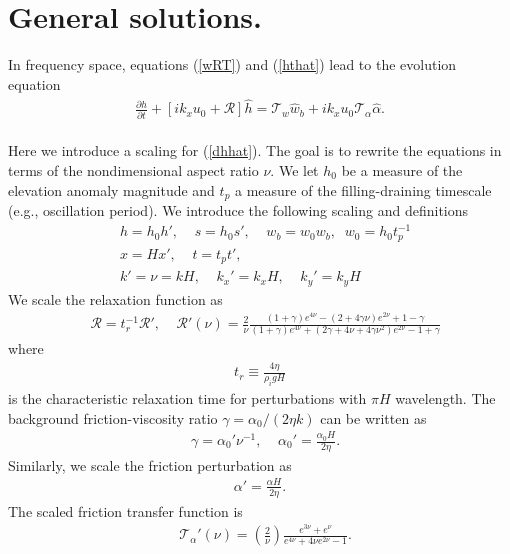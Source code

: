 \documentclass[paper=a4, fontsize=11pt]{article}
\begin{document}
\section*{General solutions.}
In frequency space,
equations (\ref{wRT}) and (\ref{hthat}) lead to the evolution equation
\begin{align}
\frac{\partial \widehat{h}}{\partial t}+ \left[ik_xu_0  + \mathcal{R}\right]\widehat{h} = \mathcal{T}_w\widehat{w}_b+ik_xu_0\mathcal{T}_{\alpha} \widehat{\alpha}. \label{dhhat}
\end{align}
\\
Here we introduce a scaling for (\ref{dhhat}).
The goal is to rewrite the equations in terms of the nondimensional
aspect ratio $\nu$.
We let $h_0$ be a measure of the elevation anomaly magnitude and
$t_p$ a measure of the filling-draining timescale (e.g., oscillation period).
We introduce the following scaling and definitions
\begin{align}
& h = h_0 h', \;\;\;\; s = h_0 s',\;\;\;\; w_b = w_0 w_{b} , \;\; w_0 = h_0 t_p^{-1} \\
& x = Hx', \;\;\;\;
t = t_p t', \;\;\;\;\\
& k' = \nu = kH , \;\;\;\; k_x' = k_x H,\;\;\;\; k_y' = k_y H
\end{align}
We scale the relaxation function as
\begin{align}
   &\mathcal{R} = t_r^{-1} \mathcal{R}', \;\;\;\;
 \mathcal{R}'(\nu) =  \frac{2}{\nu}\frac{ (1+\gamma)e^{4\nu} -(2+4\gamma\nu)e^{2\nu} +1-\gamma  }{ (1+\gamma)e^{4\nu} + (2\gamma+4\nu+4\gamma\nu^2)e^{2\nu} -1 + \gamma  }
\end{align}
where
\begin{align}
t_r \equiv \frac{4\eta}{\rho_i g H}
\end{align}
is the characteristic relaxation time for perturbations with $\pi H$ wavelength.
The background friction-viscosity ratio $\gamma=\alpha_0/(2\eta k)$ can be written as
\begin{align}
   &\gamma = \alpha_0' \nu^{-1}, \;\;\;\; \alpha_0' = \frac{\alpha_0 H}{2\eta}.
\end{align}
Similarly, we scale the friction perturbation as
\begin{align}
\alpha' = \frac{ \alpha H}{2\eta}.
\end{align}
The scaled friction transfer function is
\begin{align}
&\mathcal{T}_{\alpha}'(\nu) = \left(\frac{2}{\nu}\right)\frac{e^{3\nu} + e^{\nu}}{e^{4\nu} +4\nu e^{2\nu} -1 }.
\end{align}
\end{document}
